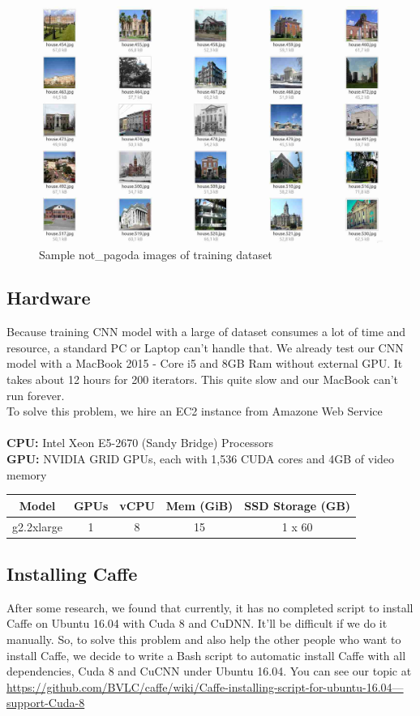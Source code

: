 \documentclass[12pt,a4paper]{article}
\begin{document}
\begin{figure}[H]
\centering
\includegraphics[width=1\textwidth]{images/sample2.jpg}
\caption{Sample not\_pagoda images of training dataset}
\label{fig:samplenotpagoda}
\end{figure}



\subsection{Hardware}
Because training CNN model with a large of dataset consumes a lot of time and resource, a standard PC or Laptop can't handle that. We already test our CNN model with a MacBook 2015 - Core i5 and 8GB Ram without external GPU. It takes about 12 hours for 200 iterators. This quite slow and our MacBook can't run forever.\\
To solve this problem, we hire an EC2 instance from Amazone Web Service\\
\\
\textbf{CPU:} Intel Xeon E5-2670 (Sandy Bridge) Processors\\
\textbf{GPU:} NVIDIA GRID GPUs, each with 1,536 CUDA cores and 4GB of video memory
\begin{center}
\begin{tabular}{| c | c | c | c | c |}
\hline
 Model & GPUs & vCPU & Mem (GiB) & SSD Storage (GB) \\ 
\hline
 g2.2xlarge & 1 & 8 & 15 & 1 x 60  \\
\hline
\end{tabular}
\end{center}

\subsection{Installing Caffe}
After some research, we found that currently, it has no completed script to install Caffe on Ubuntu 16.04 with Cuda 8 and CuDNN. It'll be difficult if we do it manually. So, to solve this problem and also help the other people who want to install Caffe, we decide to write a Bash script to automatic install Caffe with all dependencies, Cuda 8 and CuCNN under Ubuntu 16.04. You can see our topic at \href{https://github.com/BVLC/caffe/wiki/Caffe-installing-script-for-ubuntu-16.04---support-Cuda-8}{https://github.com/BVLC/caffe/wiki/Caffe-installing-script-for-ubuntu-16.04---support-Cuda-8}
\end{document}
